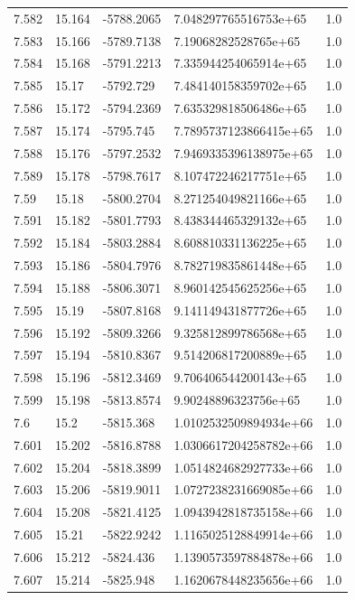 \begin{tabular}{lllll}
7.582 & 15.164 & -5788.2065 & 7.048297765516753e+65 & 1.0 \\
7.583 & 15.166 & -5789.7138 & 7.19068282528765e+65 & 1.0 \\
7.584 & 15.168 & -5791.2213 & 7.335944254065914e+65 & 1.0 \\
7.585 & 15.17 & -5792.729 & 7.484140158359702e+65 & 1.0 \\
7.586 & 15.172 & -5794.2369 & 7.635329818506486e+65 & 1.0 \\
7.587 & 15.174 & -5795.745 & 7.7895737123866415e+65 & 1.0 \\
7.588 & 15.176 & -5797.2532 & 7.9469335396138975e+65 & 1.0 \\
7.589 & 15.178 & -5798.7617 & 8.107472246217751e+65 & 1.0 \\
7.59 & 15.18 & -5800.2704 & 8.271254049821166e+65 & 1.0 \\
7.591 & 15.182 & -5801.7793 & 8.438344465329132e+65 & 1.0 \\
7.592 & 15.184 & -5803.2884 & 8.608810331136225e+65 & 1.0 \\
7.593 & 15.186 & -5804.7976 & 8.782719835861448e+65 & 1.0 \\
7.594 & 15.188 & -5806.3071 & 8.960142545625256e+65 & 1.0 \\
7.595 & 15.19 & -5807.8168 & 9.141149431877726e+65 & 1.0 \\
7.596 & 15.192 & -5809.3266 & 9.325812899786568e+65 & 1.0 \\
7.597 & 15.194 & -5810.8367 & 9.514206817200889e+65 & 1.0 \\
7.598 & 15.196 & -5812.3469 & 9.706406544200143e+65 & 1.0 \\
7.599 & 15.198 & -5813.8574 & 9.90248896323756e+65 & 1.0 \\
7.6 & 15.2 & -5815.368 & 1.0102532509894934e+66 & 1.0 \\
7.601 & 15.202 & -5816.8788 & 1.0306617204258782e+66 & 1.0 \\
7.602 & 15.204 & -5818.3899 & 1.0514824682927733e+66 & 1.0 \\
7.603 & 15.206 & -5819.9011 & 1.0727238231669085e+66 & 1.0 \\
7.604 & 15.208 & -5821.4125 & 1.0943942818735158e+66 & 1.0 \\
7.605 & 15.21 & -5822.9242 & 1.1165025128849914e+66 & 1.0 \\
7.606 & 15.212 & -5824.436 & 1.1390573597884878e+66 & 1.0 \\
7.607 & 15.214 & -5825.948 & 1.1620678448235656e+66 & 1.0 \\

\end{tabular}
